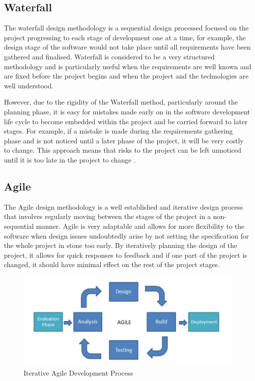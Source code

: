 \subsection{Waterfall}
The waterfall design methodology is a sequential design processed focused on the project progressing to each stage of development one at a time, for example, the design stage of the software would not take place until all requirements have been gathered and finalised.
Waterfall is considered to be a very structured methodology and is particularly useful when the requirements are well known and are fixed before the project begins and when the project and the technologies are well understood.

However, due to the rigidity of the Waterfall method, particularly around the planning phase, it is easy for mistakes made early on in the software development life cycle to become embedded within the project and be carried forward to later stages.
For example, if a mistake is made during the requirements gathering phase and is not noticed until a later phase of the project, it will be very costly to change.
This approach means that risks to the project can be left unnoticed until it is too late in the project to change \cite{kruchten2001waterfall}.

\subsection{Agile}
The Agile design methodology is a well established and iterative design process that involves regularly moving between the stages of the project in a non-sequential manner. 
Agile is very adaptable and allows for more flexibility to the software when design issues undoubtedly arise by not setting the specification for the whole project in stone too early.
By iteratively planning the design of the project, it allows for quick responses to feedback and if one part of the project is changed, it should have minimal effect on the rest of the project stages. 

\begin{figure}[ht]
	\centering
	\includegraphics[scale=0.4]{images/Agile_Image.jpg}
	\caption{Iterative Agile Development Process}
	\label{fig:agile}
\end{figure}

